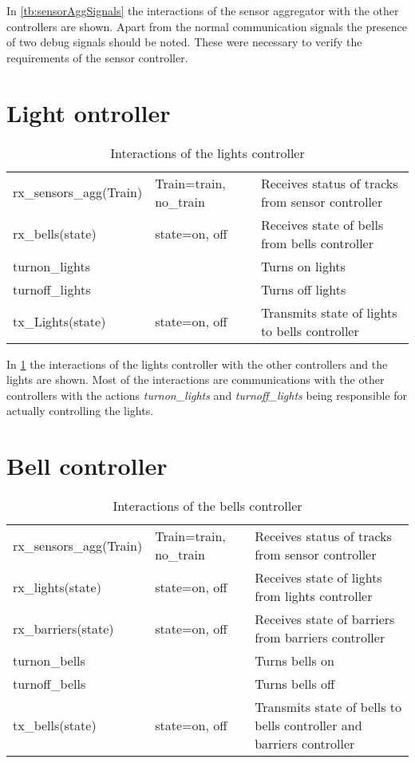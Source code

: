 \documentclass[final]{report}
\begin{document}
In \cref{tb:sensorAggSignals} the interactions of the sensor aggregator with the other controllers are shown.
Apart from the normal communication signals the presence of two debug signals should be noted.
These were necessary to verify the requirements of the sensor controller.

\section{Light ontroller}
\begin{table}[H]
\centering
\begin{tabular}{|l|l|l|}
\hline
rx\_sensors\_agg(Train)  & Train=train, no\_train & Receives status of tracks from sensor controller \\
rx\_bells(state)   & state=on, off          & Receives state of bells from bells controller               \\ \hline
turnon\_lights &         & Turns on lights                                     \\
turnoff\_lights & & Turns off lights\\
tx\_Lights(state)  & state=on, off          & Transmits state of lights to bells controller               \\ \hline
\end{tabular}
\caption{Interactions of the lights controller}
\label{tb:lightsSignals}
\end{table}

In \cref{tb:lightsSignals} the interactions of the lights controller with the other controllers and the lights are shown.
Most of the interactions are communications with the other controllers with the actions \textit{turnon\_lights} and \textit{turnoff\_lights} being responsible for actually controlling the lights.

\section{Bell controller}
\begin{table}[H]
\centering
\begin{tabular}{|l|l|l|}
\hline
rx\_sensors\_agg(Train)   & Train=train, no\_train & Receives status of tracks from sensor controller           \\
rx\_lights(state)   & state=on, off          & Receives state of lights from lights controller                      \\
rx\_barriers(state) & state=on, off          & Receives state of barriers from barriers controller                  \\ \hline
turnon\_bells   &          & Turns bells on                                              \\
turnoff\_bells   &          & Turns bells off                                              \\
tx\_bells(state)    & state=on, off          & Transmits state of bells to bells controller and barriers controller\\ \hline
\end{tabular}
\caption{Interactions of the bells controller}
\label{tb:bellsSignals}
\end{table}
\end{document}
